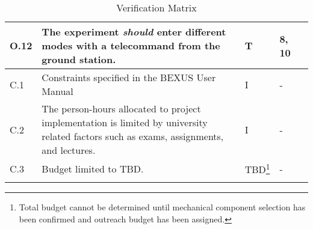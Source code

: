 \begin{longtable}[]{|m{}| m{} |m{} |m{}|m{}|}
O.12 & The experiment \textit{should} enter different modes with a telecommand from the ground station.                                                                      &      T        & 8, 10            &        \\ \hline
C.1  & Constraints specified in the BEXUS User Manual                                                                                                                          &       I       & -            &        \\ \hline
C.2  & The person-hours allocated to project implementation is limited by university related factors such as exams, assignments, and lectures.                                 &      I        & -            &        \\ \hline
C.3  & Budget limited to TBD.                                                                                                                                                  &      TBD\footnote{Total budget cannot be determined until mechanical component selection has been confirmed and outreach budget has been assigned.}        & -            &        \\ \hline

\caption{Verification Matrix}
\label{tab:var-mat}
\end{longtable}
\raggedbottom
